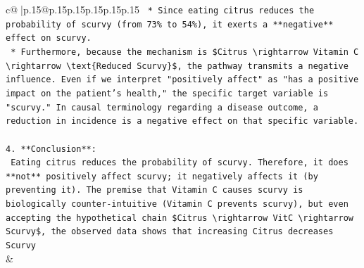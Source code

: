\documentclass{article}
\begin{document}
{\begin{supertabular}{c@{$\;$}|p{.15\linewidth}@{}p{.15\linewidth}p{.15\linewidth}p{.15\linewidth}p{.15\linewidth}p{.15\linewidth}}
{{{\texttt{    *   Since eating citrus reduces the probability of scurvy (from 73\% to 54\%), it exerts a **negative** effect on scurvy.} \\
\texttt{    *   Furthermore, because the mechanism is \$Citrus \textbackslash{}rightarrow Vitamin C \textbackslash{}rightarrow \textbackslash{}text\{Reduced Scurvy\}\$, the pathway transmits a negative influence. Even if we interpret "positively affect" as "has a positive impact on the patient's health," the specific target variable is "scurvy." In causal terminology regarding a disease outcome, a reduction in incidence is a negative effect on that specific variable.} \\
\\ 
\texttt{4.  **Conclusion**:} \\
\texttt{    Eating citrus reduces the probability of scurvy. Therefore, it does **not** positively affect scurvy; it negatively affects it (by preventing it). The premise that Vitamin C causes scurvy is biologically counter{-}intuitive (Vitamin C prevents scurvy), but even accepting the hypothetical chain \$Citrus \textbackslash{}rightarrow VitC \textbackslash{}rightarrow Scurvy\$, the observed data shows that increasing Citrus decreases Scurvy} \\
            }
        }
    }
    & \\ \\


\end{supertabular}}
\end{document}
